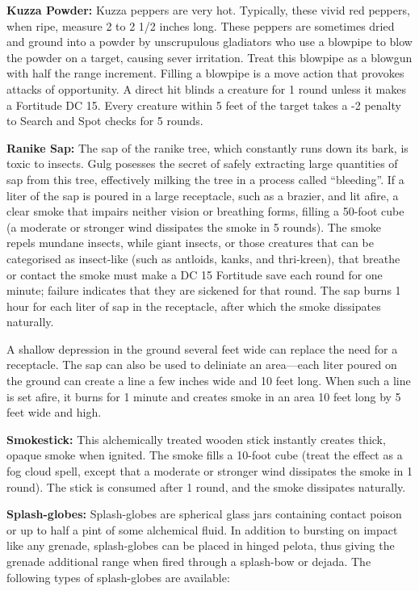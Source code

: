 \textbf{Kuzza Powder:} Kuzza peppers are very hot. Typically, these vivid red peppers, when ripe, measure 2 to 2 1/2 inches long. These peppers are sometimes dried and ground into a powder by unscrupulous gladiators who use a blowpipe to blow the powder on a target, causing sever irritation. Treat this blowpipe as a blowgun with half the range increment. Filling a blowpipe is a move action that provokes attacks of opportunity. A direct hit blinds a creature for 1 round unless it makes a Fortitude DC 15. Every creature within 5 feet of the target takes a -2 penalty to Search and Spot checks for 5 rounds.

\textbf{Ranike Sap:} The sap of the ranike tree, which constantly runs down its bark, is toxic to insects. Gulg posesses the secret of safely extracting large quantities of sap from this tree, effectively milking the tree in a process called ``bleeding''. If a liter of the sap is poured in a large receptacle, such as a brazier, and lit afire, a clear smoke that impairs neither vision or breathing forms, filling a 50-foot cube (a moderate or stronger wind dissipates the smoke in 5 rounds). The smoke repels mundane insects, while giant insects, or those creatures that can be categorised as insect-like (such as antloids, kanks, and thri-kreen), that breathe or contact the smoke must make a DC 15 Fortitude save each round for one minute; failure indicates that they are sickened for that round. The sap burns 1 hour for each liter of sap in the receptacle, after which the smoke dissipates naturally.

A shallow depression in the ground several feet wide can replace the need for a receptacle. The sap can also be used to deliniate an area---each liter poured on the ground can create a line a few inches wide and 10 feet long. When such a line is set afire, it burns for 1 minute and creates smoke in an area 10 feet long by 5 feet wide and high.

\textbf{Smokestick:} This alchemically treated wooden stick instantly creates thick, opaque smoke when ignited. The smoke fills a 10-foot cube (treat the effect as a fog cloud spell, except that a moderate or stronger wind dissipates the smoke in 1 round). The stick is consumed after 1 round, and the smoke dissipates naturally.

\textbf{Splash-globes:} Splash-globes are spherical glass jars containing contact poison or up to half a pint of some alchemical fluid. In addition to bursting on impact like any grenade, splash-globes can be placed in hinged pelota, thus giving the grenade additional range when fired through a splash-bow or dejada. The following types of splash-globes are available:

